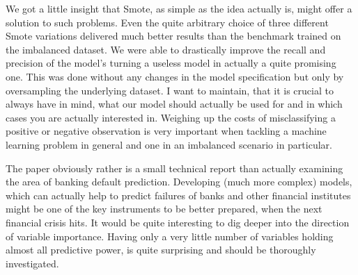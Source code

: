 \documentclass[12pt,a4paper]{article}
\begin{document}
We got a little insight that Smote, as simple as the idea actually is, might offer a solution to such problems. Even the quite arbitrary choice of three different Smote variations delivered much better results than the benchmark trained on the imbalanced dataset. We were able to drastically improve the recall and precision of the model's turning a useless model in actually a quite promising one. This was done without any changes in the model specification but only by oversampling the underlying dataset. I want to maintain, that it is crucial to always have in mind, what our model should actually be used for and in which cases you are actually interested in. Weighing up the costs of misclassifying a positive or negative observation is very important when tackling a machine learning problem in general and one in an imbalanced scenario in particular.

The paper obviously rather is a small technical report than actually examining the area of banking default prediction. Developing (much more complex) models, which can actually help to predict failures of banks and other financial institutes might be one of the key instruments to be better prepared, when the next financial crisis hits. It would be quite interesting to dig deeper into the direction of variable importance. Having only a very little number of variables holding almost all predictive power, is quite surprising and should be thoroughly investigated.
\end{document}
